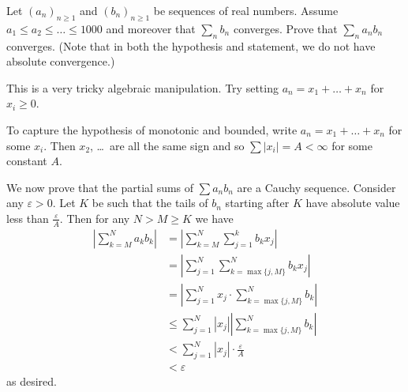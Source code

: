 \begin{problem}
	\gim
	Let $(a_n)_{n \ge 1}$ and $(b_n)_{n \ge 1}$ be sequences of real numbers.
	Assume $a_1 \le a_2 \le \dots \le 1000$
	and moreover that $\sum_n b_n$ converges.
	Prove that $\sum_n a_n b_n$ converges.
	(Note that in both the hypothesis and statement,
	we do not have absolute convergence.)
	\begin{hint}
		This is a very tricky algebraic manipulation.
		Try setting $a_n = x_1 + \dots + x_n$ for $x_i \ge 0$.
	\end{hint}
	\begin{sol}
		To capture the hypothesis of monotonic and bounded,
		write $a_n = x_1 + \dots + x_n$ for some $x_i$.
		Then $x_2$, \dots\ are all the same sign and so $\sum |x_i| = A < \infty$
		for some constant $A$.

		We now prove that the partial sums of $\sum a_n b_n$ are a Cauchy sequence.
		Consider any $\varepsilon > 0$.
		Let $K$ be such that the tails of $b_n$
		starting after $K$ have absolute value less than $\frac{\varepsilon}{A}$.
		Then for any $N > M \ge K$ we have
		\begin{align*}
			\left\lvert \sum_{k=M}^N a_k b_k \right\rvert
			&= \left\lvert \sum_{k=M}^N \sum_{j=1}^k b_k x_j \right\rvert \\
			&= \left\lvert \sum_{j=1}^N \sum_{k=\max\{j,M\}}^N b_k x_j \right\rvert \\
			&= \left\lvert \sum_{j=1}^N x_j \cdot \sum_{k=\max\{j,M\}}^N b_k\right\rvert \\
			&\le \sum_{j=1}^N |x_j| \left\lvert \sum_{k=\max\{j,M\}}^N b_k \right\rvert \\
			&< \sum_{j=1}^N |x_j| \cdot \frac{\varepsilon}{A} \\
			&< \varepsilon
		\end{align*}
		as desired.
	\end{sol}
\end{problem}

